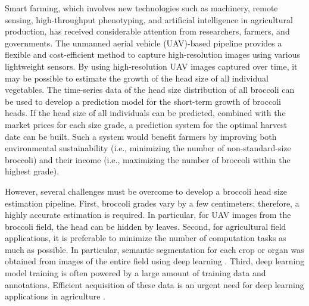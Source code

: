 Smart farming, which involves new technologies such as machinery, remote sensing, high-throughput phenotyping, and artificial intelligence in agricultural production, has received considerable attention from researchers, farmers, and governments. The unmanned aerial vehicle (UAV)-based pipeline provides a flexible and cost-efficient method to capture high-resolution images using various lightweight sensors. By using high-resolution UAV images captured over time, it may be possible to estimate the growth of the head size of all individual vegetables. The time-series data of the head size distribution of all broccoli can be used to develop a prediction model for the short-term growth of broccoli heads. If the head size of all individuals can be predicted, combined with the market prices for each size grade, a prediction system for the optimal harvest date can be built. Such a system would benefit farmers by improving both environmental sustainability (i.e., minimizing the number of non-standard-size broccoli) and their income (i.e., maximizing the number of broccoli within the highest grade).

However, several challenges must be overcome to develop a broccoli head size estimation pipeline. First, broccoli grades vary by a few centimeters; therefore, a highly accurate estimation is required. In particular, for UAV images from the broccoli field, the head can be hidden by leaves. Second, for agricultural field applications, it is preferable to minimize the number of computation tasks as much as possible. In particular, semantic segmentation for each crop or organ was obtained from images of the entire field using deep learning \citep{bauer_combining_2019,zhou_automated_2022}. Third, deep learning model training is often powered by a large amount of training data and annotations. Efficient acquisition of these data is an urgent need for deep learning applications in agriculture \citep{kierdorf_growliflower_2022}.

